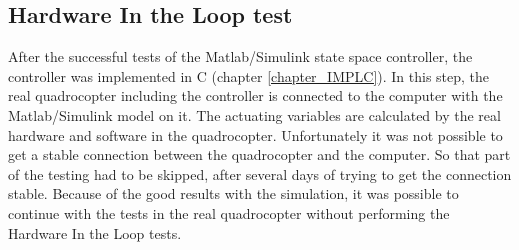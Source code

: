 \subsection{Hardware In the Loop test}\label{chapter_HILTest}

After the successful tests of the Matlab/Simulink state space controller, the controller was implemented in C (chapter \ref{chapter_IMPLC}). In this step, the real quadrocopter including the controller is connected to the computer with the Matlab/Simulink model on it. The actuating variables are calculated by the real hardware and software in the quadrocopter. Unfortunately it was not possible to get a stable connection between the quadrocopter and the computer. So that part of the testing had to be skipped, after several days of trying to get the connection stable. Because of the good results with the simulation, it was possible to continue with the tests in the real quadrocopter without performing the Hardware In the Loop tests.